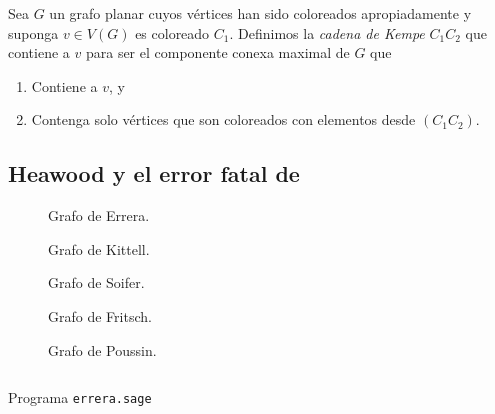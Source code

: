 \documentclass[3p,times,a4paper,twocolumn,authoryear]{elsarticle} %
\begin{document}
\begin{definition}

Sea $G$ un grafo planar cuyos vértices han sido coloreados apropiadamente y suponga $v\in V(G)$ es coloreado $C_1$. Definimos la \emph{cadena de Kempe} $C_1C_2$ que contiene a $v$ para ser el componente conexa maximal de $G$ que
	
\begin{enumerate}%

	\item Contiene a $v$, y

	\item Contenga solo vértices que son coloreados con elementos desde $(C_1C_2)$.

\end{enumerate}
	
\end{definition}

\subsection{Heawood y el error fatal de \citeauthor{kempe}}\label{sec:3.3}

\begin{figure}[H]
	\centering
	\scalebox{.3}{}
	\caption{Grafo de Errera.}
\end{figure}

\begin{figure}[H]
	\centering
	\scalebox{.25}{}
	\caption{Grafo de Kittell.}
\end{figure}

\begin{figure}[H]
	\centering
	\scalebox{0.6}{}
	\caption{Grafo de Soifer.}
\end{figure}

\begin{figure}[H]
	\centering
	\scalebox{0.45}{}
	\caption{Grafo de Fritsch.}
\end{figure}

\begin{figure}[H]
	\centering
	\scalebox{0.6}{}
	\caption{Grafo de Poussin.}
\end{figure}

\begin{listing}[H]
	\inputminted{python}{../code/errera.sage}
	\caption{Programa \texttt{errera.sage}}
\end{listing}
\end{document}
